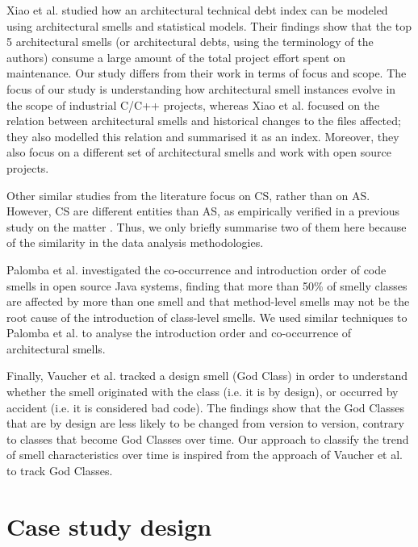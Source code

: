 Xiao et al. \cite{Xiao2016} studied how an architectural technical debt index can be modeled using architectural smells and statistical models. Their findings show that the top 5 architectural smells (or architectural debts, using the terminology of the authors) consume a large amount of the total project effort spent on maintenance.
Our study differs from their work in terms of focus and scope. 
The focus of our study is understanding how architectural smell instances evolve in the scope of industrial C/C++ projects, whereas Xiao et al. focused on the relation between architectural smells and historical changes to the files affected; they also modelled this relation and summarised it as an index.
Moreover, they also focus on a different set of architectural smells and work with open source projects.

Other similar studies from the literature focus on CS, rather than on AS. However, CS are different entities than AS, as empirically verified in a previous study on the matter \cite{Arcelli2019}. Thus, we only briefly summarise two of them here because of the similarity in the data analysis methodologies.

Palomba et al. \cite{Palomba2018} investigated the co-occurrence and introduction order of code smells in open source Java systems, finding that more than 50\% of smelly classes are affected by more than one smell and that method-level smells may not be the root cause of the introduction of class-level smells.
We used similar techniques to Palomba et al. to analyse the introduction order and co-occurrence of architectural smells.

Finally, Vaucher et al. \cite{Vaucher2009} tracked a design smell (God Class) in order to understand whether the smell originated with the class (i.e. it is by design), or occurred by accident (i.e. it is considered bad code).
The findings show that the God Classes that are by design are less likely to be changed from version to version, contrary to classes that become God Classes over time.
Our approach to classify the trend of smell characteristics over time is inspired from the approach of Vaucher et al. to track God Classes.


\section{Case study design}\label{c4:sec:case-design}

